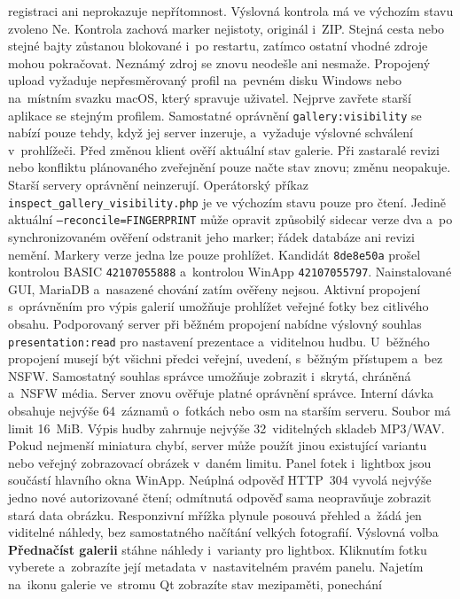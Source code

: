 \documentclass[11pt,a4paper]{article}
\newcommand{\ui}[1]{\textbf{#1}}
\begin{document}
registraci ani neprokazuje nepřítomnost. Výslovná kontrola má ve výchozím stavu
zvoleno Ne. Kontrola zachová marker nejistoty, originál i~ZIP. Stejná cesta
nebo stejné bajty zůstanou blokované i~po restartu, zatímco ostatní vhodné
zdroje mohou pokračovat. Neznámý zdroj se znovu neodešle ani nesmaže.
Propojený upload vyžaduje nepřesměrovaný profil na~pevném disku Windows
nebo na~místním svazku macOS, který spravuje uživatel. Nejprve zavřete
starší aplikace se stejným profilem.
Samostatné oprávnění \texttt{gallery:visibility} se nabízí pouze tehdy, když
jej server inzeruje, a~vyžaduje výslovné schválení v~prohlížeči. Před změnou
klient ověří aktuální stav galerie. Při zastaralé revizi nebo konfliktu
plánovaného zveřejnění pouze načte stav znovu; změnu neopakuje. Starší servery
oprávnění neinzerují. Operátorský příkaz
\texttt{inspect\_gallery\_visibility.php} je ve výchozím stavu pouze pro čtení.
Jedině aktuální \texttt{--reconcile=FINGERPRINT} může opravit způsobilý
sidecar verze dva a~po synchronizovaném ověření odstranit jeho marker; řádek
databáze ani revizi nemění. Markery verze jedna lze pouze prohlížet.
Kandidát \texttt{8de8e50a} prošel kontrolou BASIC \texttt{42107055888}
a~kontrolou WinApp \texttt{42107055797}. Nainstalované GUI, MariaDB
a~nasazené chování zatím ověřeny nejsou.
Aktivní propojení s~oprávněním pro výpis galerií umožňuje prohlížet veřejné
fotky bez citlivého obsahu. Podporovaný server při běžném propojení nabídne
výslovný souhlas \texttt{presentation:read} pro nastavení prezentace
a~viditelnou hudbu. U~běžného propojení musejí být všichni předci veřejní,
uvedení, s~běžným přístupem a~bez NSFW. Samostatný souhlas správce umožňuje
zobrazit i~skrytá, chráněná a~NSFW média. Server znovu ověřuje platné
oprávnění správce. Interní dávka obsahuje nejvýše 64~záznamů o~fotkách
nebo osm na starším serveru. Soubor má limit 16~MiB. Výpis hudby zahrnuje nejvýše 32~viditelných
skladeb MP3/WAV. Pokud nejmenší miniatura chybí, server může použít jinou
existující variantu nebo veřejný zobrazovací obrázek v~daném limitu.
Panel fotek i~lightbox jsou součástí hlavního okna WinApp.
Neúplná odpověď HTTP~304 vyvolá nejvýše jedno nové autorizované čtení;
odmítnutá odpověď sama neopravňuje zobrazit stará data obrázku.
Responzivní mřížka plynule posouvá přehled a~žádá jen viditelné náhledy,
bez samostatného načítání velkých fotografií. Výslovná volba
\ui{Přednačíst galerii} stáhne náhledy i~varianty pro lightbox.
Kliknutím fotku vyberete a~zobrazíte její metadata v~nastavitelném pravém panelu.
Najetím na~ikonu galerie ve~stromu Qt zobrazíte stav mezipaměti, ponechání
\end{document}
